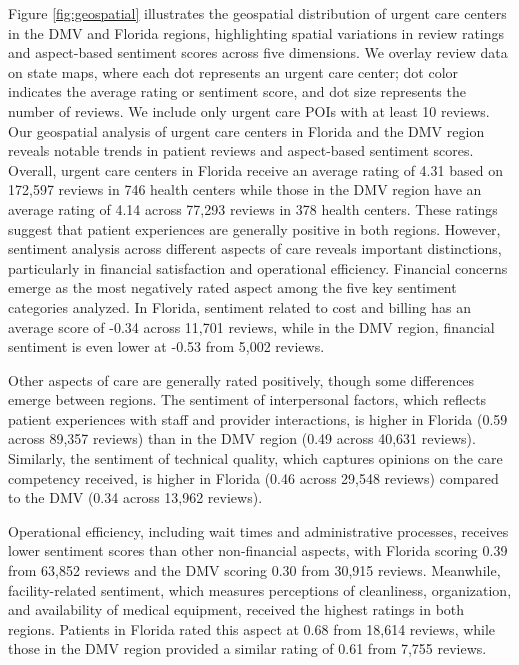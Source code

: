 \documentclass[journal,twoside,web]{ieeecolor}
\begin{document}
Figure \ref{fig:geospatial} illustrates the geospatial distribution of urgent care centers in the DMV and Florida regions, highlighting spatial variations in review ratings and aspect-based sentiment scores across five dimensions. We overlay review data on state maps, where each dot represents an urgent care center; dot color indicates the average rating or sentiment score, and dot size represents the number of reviews. We include only urgent care POIs with at least 10 reviews. Our geospatial analysis of urgent care centers in Florida and the DMV region reveals notable trends in patient reviews and aspect-based sentiment scores. Overall, urgent care centers in Florida receive an average rating of 4.31 based on 172,597 reviews in 746 health centers while those in the DMV region have an average rating of 4.14 across 77,293 reviews in 378 health centers. These ratings suggest that patient experiences are generally positive in both regions. However, sentiment analysis across different aspects of care reveals important distinctions, particularly in financial satisfaction and operational efficiency. Financial concerns emerge as the most negatively rated aspect among the five key sentiment categories analyzed. In Florida, sentiment related to cost and billing has an average score of -0.34 across 11,701 reviews, while in the DMV region, financial sentiment is even lower at -0.53 from 5,002 reviews.

Other aspects of care are generally rated positively, though some differences emerge between regions. The sentiment of interpersonal factors, which reflects patient experiences with staff and provider interactions, is higher in Florida (0.59 across 89,357 reviews) than in the DMV region (0.49 across 40,631 reviews). Similarly, the sentiment of technical quality, which captures opinions on the care competency received, is higher in Florida (0.46 across 29,548 reviews) compared to the DMV (0.34 across 13,962 reviews).

Operational efficiency, including wait times and administrative processes, receives lower sentiment scores than other non-financial aspects, with Florida scoring 0.39 from 63,852 reviews and the DMV scoring 0.30 from 30,915 reviews. Meanwhile, facility-related sentiment, which measures perceptions of cleanliness, organization, and availability of medical equipment, received the highest ratings in both regions. Patients in Florida rated this aspect at 0.68 from 18,614 reviews, while those in the DMV region provided a similar rating of 0.61 from 7,755 reviews.
\end{document}
